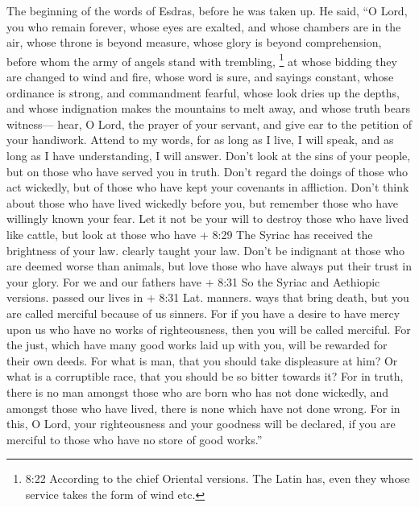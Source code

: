 The beginning of the words of Esdras, before he was taken up. He said,
 ``O Lord, you who remain forever, whose eyes are exalted,
and whose chambers are in the air,  whose throne is beyond
measure, whose glory is beyond comprehension, before whom the army of
angels stand with trembling,  \footnote{8:22 According to
  the chief Oriental versions. The Latin has, even they whose service
  takes the form of wind etc.} at whose bidding they are changed to wind
and fire, whose word is sure, and sayings constant, whose ordinance is
strong, and commandment fearful,  whose look dries up the
depths, and whose indignation makes the mountains to melt away, and
whose truth bears witness---  hear, O Lord, the prayer of
your servant, and give ear to the petition of your handiwork.
 Attend to my words, for as long as I live, I will speak,
and as long as I have understanding, I will answer.  Don't
look at the sins of your people, but on those who have served you in
truth.  Don't regard the doings of those who act wickedly,
but of those who have kept your covenants in affliction. 
Don't think about those who have lived wickedly before you, but remember
those who have willingly known your fear.  Let it not be
your will to destroy those who have lived like cattle, but look at those
who have + 8:29 The Syriac has received the brightness of your law.
clearly taught your law.  Don't be indignant at those who
are deemed worse than animals, but love those who have always put their
trust in your glory.  For we and our fathers have + 8:31 So
the Syriac and Aethiopic versions. passed our lives in + 8:31 Lat.
manners. ways that bring death, but you are called merciful because of
us sinners.  For if you have a desire to have mercy upon us
who have no works of righteousness, then you will be called merciful.
 For the just, which have many good works laid up with you,
will be rewarded for their own deeds.  For what is man,
that you should take displeasure at him? Or what is a corruptible race,
that you should be so bitter towards it?  For in truth,
there is no man amongst those who are born who has not done wickedly,
and amongst those who have lived, there is none which have not done
wrong.  For in this, O Lord, your righteousness and your
goodness will be declared, if you are merciful to those who have no
store of good works.''

